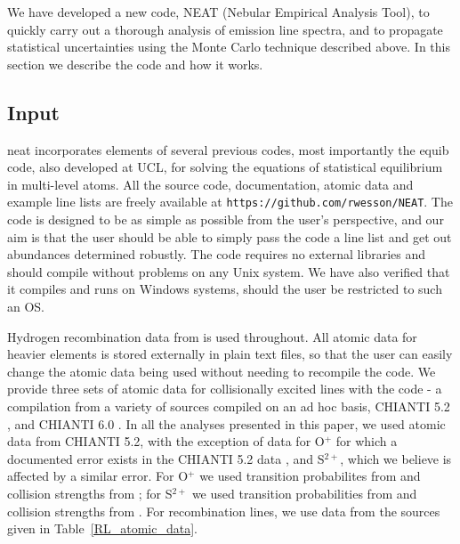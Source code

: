 \documentclass[useAMS,usenatbib]{mn2e}
\begin{document}
We have developed a new code, NEAT (Nebular Empirical Analysis Tool), to quickly carry out a thorough analysis of emission line spectra, and to propagate statistical uncertainties using the Monte Carlo technique described above.  In this section we describe the code and how it works.

\subsection{Input}

{\sc neat} incorporates elements of several previous codes, most importantly the {\sc equib} code, also developed at UCL, for solving the equations of statistical equilibrium in multi-level atoms.  All the source code, documentation, atomic data and example line lists are freely available at \texttt{https://github.com/rwesson/NEAT}.  The code is designed to be as simple as possible from the user's perspective, and our aim is that the user should be able to simply pass the code a line list and get out abundances determined robustly.  The code requires no external libraries and should compile without problems on any Unix system.  We have also verified that it compiles and runs on Windows systems, should the user be restricted to such an OS.

Hydrogen recombination data from \citet{1995MNRAS.272...41S} is used throughout.  All atomic data for heavier elements is stored externally in plain text files, so that the user can easily change the atomic data being used without needing to recompile the code.  We provide three sets of atomic data for collisionally excited lines with the code - a compilation from a variety of sources compiled on an ad hoc basis, CHIANTI 5.2 \citep{2006ApJS..162..261L}, and CHIANTI 6.0 \citep{2009A&A...498..915D}.  In all the analyses presented in this paper, we used atomic data from CHIANTI 5.2, with the exception of data for O$^{+}$ for which a documented error exists in the CHIANTI 5.2 data \citep{2009MNRAS.397..903K}, and S$^{2+}$, which we believe is affected by a similar error.  For O$^{+}$ we used transition probabilites from \citet{1982MNRAS.198..111Z} and collision strengths from \citet{1976MNRAS.177...31P}; for S$^{2+}$ we used transition probabilities from \citet{1982MNRAS.199.1025M} and collision strengths from \citet{1983IAUS..103..143M}.  For recombination lines, we use data from the sources given in Table~\ref{RL_atomic_data}.
\end{document}
